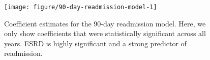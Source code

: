 \documentclass[12pt]{ociamthesis}\usepackage[]{graphicx}\usepackage[]{color}
\newenvironment{knitrout}{}{} %
\begin{document}
\begin{knitrout}
\color{fgcolor}\begin{figure}

{\centering \texttt{[image: figure/90-day-readmission-model-1]} 

}

\caption[Coefficient estimates for the 90-day readmission model]{Coefficient estimates for the 90-day readmission model. Here, we only show coefficients that were statistically significant across all years. ESRD is highly significant and a strong predictor of readmission.}\label{fig:90-day-readmission-model}
\end{figure}


\end{knitrout}
\label{fig:90-day-readmission-model}



% 
\renewcommand{\bibname}{References}
\printbibliography
\end{document}
